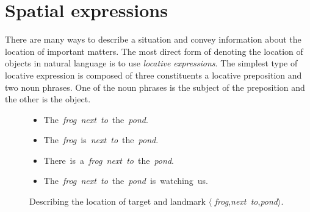 \section{Spatial expressions}
\label{sec:spatial:expressions}
There are many ways to describe a situation and convey information about the location of important matters. The most direct form of denoting the location of objects in natural language is to use \emph{locative expressions}. 
The simplest type of locative expression is composed of three constituents \textemdash  a locative preposition and two noun phrases.
One of the noun phrases is the subject of the preposition and the other is the object. 
\begin{figure}[t]
	\centering
	\begin{minipage}{0.6\linewidth}
		\begin{itemize}[leftmargin=0.1cm,itemsep=1em]
			\item[] The~\textit{frog~next~to}~the~\textit{pond}.
			\item[] The~\textit{frog}~is~\textit{next~to}~the~\textit{pond}.
			\item[] There~is~a~\textit{frog~next~to}~the~\textit{pond}.
			\item[] The~\textit{frog~next~to}~the~\textit{pond}~is~watching~us.
		\end{itemize}
	\end{minipage}%
	\begin{minipage}{0.4\linewidth}
		\centering
	\end{minipage}%
	\caption{Describing the location of target and landmark \textemdash  $\langle$ \textit{frog},\textit{next~to},\textit{pond}$\rangle$.}\label{fig:frog-next-to-pond}
\end{figure}
